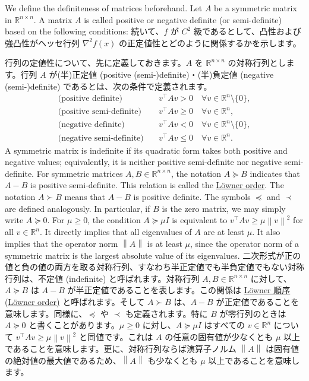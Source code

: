 \documentclass[0_main]{subfiles}
\begin{document}
    We define the definiteness of matrices beforehand. Let $A$ be a symmetric matrix in $\mathbb{R}^{n \times n}$. A matrix $A$ is called positive or negative definite (or semi-definite) based on the following conditions:
\else
    続いて、$f$ が $C^2$ 級であるとして、凸性および強凸性がヘッセ行列 $\nabla^2 f(x)$ の正定値性とどのように関係するかを示します。

    行列の定値性について、先に定義しておきます。$A$ を $\mathbb{R}^{n \times n}$ の対称行列とします。行列 $A$ が(半)正定値 (positive (semi-)definite)・(半)負定値 (negative (semi-)definite) であるとは、次の条件で定義されます。
\fi
\begin{align*}
    \textrm{(positive definite)} \quad      & v^\top A v > 0 \quad \forall v \in \mathbb{R}^n \setminus \{ 0 \}, \\
    \textrm{(positive semi-definite)} \quad & v^\top A v \ge 0 \quad \forall v \in \mathbb{R}^n,                 \\
    \textrm{(negative definite)} \quad      & v^\top A v < 0 \quad \forall v \in \mathbb{R}^n \setminus \{ 0 \}, \\
    \textrm{(negative semi-definite)} \quad & v^\top A v \le 0 \quad \forall v \in \mathbb{R}^n.
\end{align*}
\ifEn
    A symmetric matrix is indefinite if its quadratic form takes both positive and negative values; equivalently, it is neither positive semi-definite nor negative semi-definite. For symmetric matrices $A,B \in \mathbb{R}^{n \times n}$, the notation $A \succeq B$ indicates that $A-B$ is positive semi-definite. This relation is called the \href{https://en.wikipedia.org/wiki/Loewner_order}{L{\"o}wner order}. The notation $A \succ B$ means that $A-B$ is positive definite. The symbols $\preceq$ and $\prec$ are defined analogously. In particular, if $B$ is the zero matrix, we may simply write $A \succeq 0$. For $\mu \geq 0$, the condition $A \succeq \mu I$ is equivalent to $v^\top A v \ge \mu \left\lVert v \right\rVert^2$ for all $v \in \mathbb{R}^n$. It directly implies that all eigenvalues of $A$ are at least $\mu$. It also implies that the operator norm $\left\lVert A \right\rVert$ is at least $\mu$, since the operator norm of a symmetric matrix is the largest absolute value of its eigenvalues.
\else
    二次形式が正の値と負の値の両方を取る対称行列、すなわち半正定値でも半負定値でもない対称行列は、不定値 (indefinite) と呼ばれます。対称行列 $A,B \in \mathbb{R}^{n \times n}$ に対して、$A \succeq B$ は $A-B$ が半正定値であることを表します。この関係は \href{https://en.wikipedia.org/wiki/Loewner_order}{L{\"o}wner 順序 (L{\"o}wner order)} と呼ばれます。そして $A \succ B$ は、$A-B$ が正定値であることを意味します。同様に、$\preceq$ や $\prec$ も定義されます。特に $B$ が零行列のときは $A \succeq 0$ と書くことがあります。$\mu \geq 0$ に対し、$A \succeq \mu I$ はすべての $v \in \mathbb{R}^n$ について $v^\top A v \ge \mu \left\lVert v \right\rVert^2$ と同値です。これは $A$ の任意の固有値が少なくとも $\mu$ 以上であることを意味します。更に、対称行列ならば演算子ノルム $\left\lVert A \right\rVert$ は固有値の絶対値の最大値であるため、$\left\lVert A \right\rVert$ も少なくとも $\mu$ 以上であることを意味します。
\fi
\end{document}
